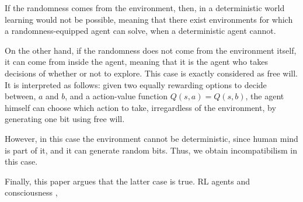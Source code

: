 \documentclass[a4paper]{article}
\begin{document}
If the randomness comes from the environment, then, in a deterministic world learning would not be possible, meaning that there exist environments for which a randomness-equipped agent can solve, when a deterministic agent cannot.

On the other hand, if the randomness does not come from the environment itself, it can come from inside the agent, meaning that it is the agent who takes decisions of whether or not to explore. This case is exactly considered as free will. It is interpreted as follows: given two equally rewarding options to decide between, $a$ and $b$, and a action-value function $Q(s, a)=Q(s, b)$, the agent himself can choose which action to take, irregardless of the environment, by generating one bit using free will.

However, in this case the environment cannot be deterministic, since human mind is part of it, and it can generate random bits. Thus, we obtain incompatibilism in this case.

Finally, this paper argues that the latter case is true. RL agents and consciousness \cite{rlmorality1}, \cite{rlmorality2}
\end{document}
